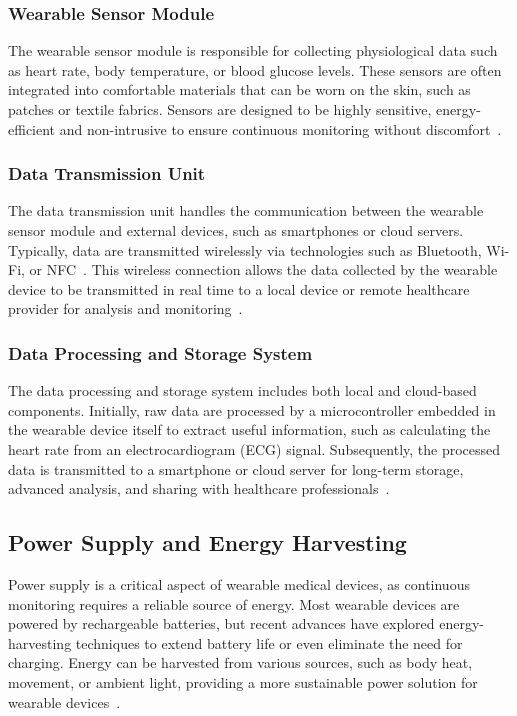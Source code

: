 \documentclass[journal]{IEEEtran}
\begin{document}
        \subsubsection{Wearable Sensor Module}
        The wearable sensor module is responsible for collecting physiological data such as heart rate, body temperature, or blood glucose levels. These sensors are often integrated into comfortable materials that can be worn on the skin, such as patches or textile fabrics. Sensors are designed to be highly sensitive, energy-efficient and non-intrusive to ensure continuous monitoring without discomfort~\cite{Saifuzzaman2021}.
        
        \subsubsection{Data Transmission Unit}
        The data transmission unit handles the communication between the wearable sensor module and external devices, such as smartphones or cloud servers. Typically, data are transmitted wirelessly via technologies such as Bluetooth, Wi-Fi, or NFC~\cite{Guk2019}. This wireless connection allows the data collected by the wearable device to be transmitted in real time to a local device or remote healthcare provider for analysis and monitoring~\cite{Nahavandi2022}.

        \subsubsection{Data Processing and Storage System}
        The data processing and storage system includes both local and cloud-based components. Initially, raw data are processed by a microcontroller embedded in the wearable device itself to extract useful information, such as calculating the heart rate from an electrocardiogram (ECG) signal. Subsequently, the processed data is transmitted to a smartphone or cloud server for long-term storage, advanced analysis, and sharing with healthcare professionals~\cite{Veeravalli2017}.

    \subsection{Power Supply and Energy Harvesting}
    Power supply is a critical aspect of wearable medical devices, as continuous monitoring requires a reliable source of energy. Most wearable devices are powered by rechargeable batteries, but recent advances have explored energy-harvesting techniques to extend battery life or even eliminate the need for charging. Energy can be harvested from various sources, such as body heat, movement, or ambient light, providing a more sustainable power solution for wearable devices~\cite{Ates2022}.
\end{document}
